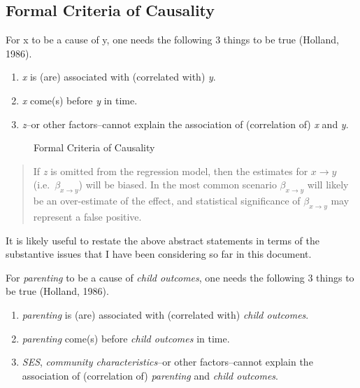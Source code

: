 \documentclass[
  letterpaper,
  DIV=11,
  numbers=noendperiod]{scrreprt}
\providecommand{\tightlist}{%
  \setlength{\itemsep}{0pt}\setlength{\parskip}{0pt}}\usepackage{longtable,booktabs,array}
\begin{document}
\hypertarget{formal-criteria-of-causality}{%
\subsection{Formal Criteria of
Causality}\label{formal-criteria-of-causality}}

For x to be a cause of y, one needs the following 3 things to be true
(Holland, 1986).

\begin{enumerate}
\def\labelenumi{\arabic{enumi}.}
\tightlist
\item
  \emph{x} is (are) associated with (correlated with) \emph{y}.
\item
  \emph{x} come(s) before \emph{y} in time.
\item
  \emph{z}--or other factors--cannot explain the association of
  (correlation of) \emph{x} and \emph{y}.
\end{enumerate}

\begin{figure}

{\centering 

}

\caption{\label{fig-causality}Formal Criteria of Causality}

\end{figure}

\begin{quote}
If \emph{z} is omitted from the regression model, then the estimates for
\(x \rightarrow y\) (i.e.~\(\beta_{x \rightarrow y}\)) will be biased.
In the most common scenario \(\beta_{x \rightarrow y}\) will likely be
an over-estimate of the effect, and statistical significance of
\(\beta_{x \rightarrow y}\) may represent a false positive.
\end{quote}

It is likely useful to restate the above abstract statements in terms of
the substantive issues that I have been considering so far in this
document.

For \emph{parenting} to be a cause of \emph{child outcomes}, one needs
the following 3 things to be true (Holland, 1986).

\begin{enumerate}
\def\labelenumi{\arabic{enumi}.}
\tightlist
\item
  \emph{parenting} is (are) associated with (correlated with)
  \emph{child outcomes}.
\item
  \emph{parenting} come(s) before \emph{child outcomes} in time.
\item
  \emph{SES}, \emph{community characteristics}--or other factors--cannot
  explain the association of (correlation of) \emph{parenting} and
  \emph{child outcomes}.
\end{enumerate}
\end{document}
